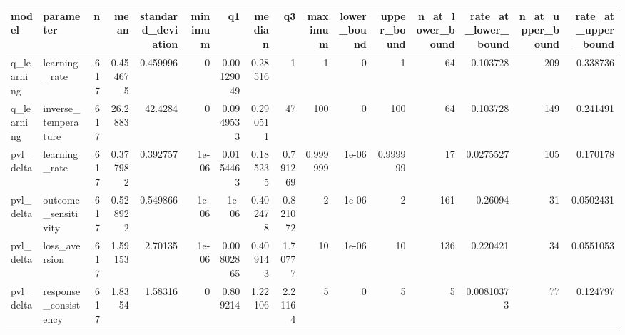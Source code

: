 \begin{tabular}{llrrrrrrrrrrrrrr}
\toprule
model & parameter & n & mean & standard\_deviation & minimum & q1 & median & q3 & maximum & lower\_bound & upper\_bound & n\_at\_lower\_bound & rate\_at\_lower\_bound & n\_at\_upper\_bound & rate\_at\_upper\_bound \\
\midrule
q\_learning & learning\_rate & 617 & 0.454675 & 0.459996 & 0 & 0.00129049 & 0.28516 & 1 & 1 & 0 & 1 & 64 & 0.103728 & 209 & 0.338736 \\
q\_learning & inverse\_temperature & 617 & 26.2883 & 42.4284 & 0 & 0.0949533 & 0.290511 & 47 & 100 & 0 & 100 & 64 & 0.103728 & 149 & 0.241491 \\
pvl\_delta & learning\_rate & 617 & 0.377982 & 0.392757 & 1e-06 & 0.0154463 & 0.185235 & 0.791269 & 0.999999 & 1e-06 & 0.999999 & 17 & 0.0275527 & 105 & 0.170178 \\
pvl\_delta & outcome\_sensitivity & 617 & 0.528922 & 0.549866 & 1e-06 & 1e-06 & 0.402478 & 0.821072 & 2 & 1e-06 & 2 & 161 & 0.26094 & 31 & 0.0502431 \\
pvl\_delta & loss\_aversion & 617 & 1.59153 & 2.70135 & 1e-06 & 0.00802865 & 0.409143 & 1.70777 & 10 & 1e-06 & 10 & 136 & 0.220421 & 34 & 0.0551053 \\
pvl\_delta & response\_consistency & 617 & 1.8354 & 1.58316 & 0 & 0.809214 & 1.22106 & 2.21164 & 5 & 0 & 5 & 5 & 0.00810373 & 77 & 0.124797 \\
\bottomrule
\end{tabular}
